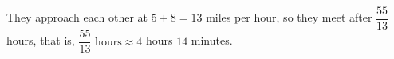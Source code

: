 They approach each other at $5+8=13$ miles per hour, so they meet after $\dfrac{55}{13}$ hours, that is, $\boxed{\dfrac{55}{13}\text{ hours}}\approx4$ hours $14$ minutes.
